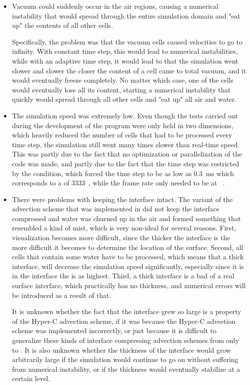 \begin{itemize}
    \item Vacuum could suddenly occur in the air regions, causing a numerical instability that would spread through the entire simulation domain and "eat up" the contents of all other cells.
    
    Specifically, the problem was that the vacuum cells caused velocities to go to infinity. With constant time step, this would lead to numerical instabilities, while with an adaptive time step, it would lead to that the simulation went slower and slower the closer the content of a cell came to total vacuum, and it would eventually freeze completely. No matter which case, one of the cells would eventually lose all its content, starting a numerical instability that quickly would spread through all other cells and "eat up" all air and water.
    
    \item The simulation speed was extremely low. Even though the tests carried out during the development of the program were only held in two dimensions, which heavily reduced the number of cells that had to be processed every time step, the simulation still went many times slower than real-time speed. This was partly due to the fact that no optimization or parallelization of the code was made, and partly due to the fact that the time step was restricted by the \CFL condition, which forced the time step to be as low as 0.3~ms which corresponds to a  of 3333~\FPS, while the frame rate only needed to be at \flightsimulatorfps~\FPS.
    
    \item There were problems with keeping the interface intact. The variant of the  advection scheme that was implemented in \thisprojectwork did not keep the interface compressed and water was churned up in the air and formed something that resembled a kind of mist, which is very non-ideal for several reasons. First, visualization becomes more difficult, since the thicker the interface is the more difficult it becomes to determine the location of the surface. Second, all cells that contain some water have to be processed, which means that a thick interface, will decrease the simulation speed significantly, especially since it is in the interface the  is as highest. Third, a thick interface is a bad \approximation of a real surface interface, which practically has no thickness, and numerical errors will be introduced as a result of that.
    
    It is unknown whether the fact that the interface grew so large is a property of the Hyper-C advection scheme, if it was because the Hyper-C advection scheme was implemented incorrectly, or just because it is difficult to generalize these kinds of interface compressing advection schemes from only  to . It is also unknown whether the thickness of the interface would grow arbitrarily large if the simulation would continue to go on without suffering from numerical instability, or if the thickness would eventually stabilize at a certain level.
\end{itemize}

